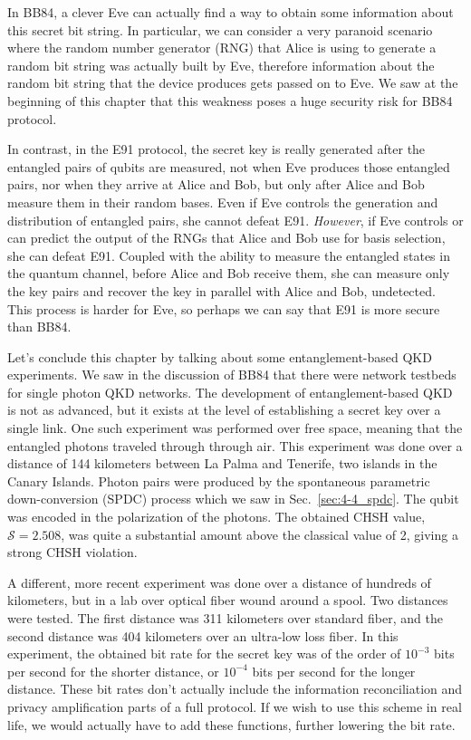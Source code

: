 In BB84, a clever Eve can actually find a way to obtain some information about this secret bit string. In particular, we can consider a very paranoid scenario where the random number generator (RNG) that Alice is using to generate a random bit string was actually built by Eve, therefore information about the random bit string that the device produces gets passed on to Eve. We saw at the beginning of this chapter that this weakness poses a huge security risk for BB84 protocol.

In contrast, in the E91 protocol, the secret key is really generated after the entangled pairs of qubits are measured, not when Eve produces those entangled pairs, nor when they arrive at Alice and Bob, but only after Alice and Bob measure them in their random bases. Even if Eve controls the generation and distribution of entangled pairs, she cannot defeat E91. \emph{However}, if Eve controls or can predict the output of the RNGs that Alice and Bob use for basis selection, she can defeat E91. Coupled with the ability to measure the entangled states in the quantum channel, before Alice and Bob receive them, she can measure only the key pairs and recover the key in parallel with Alice and Bob, undetected. This process is harder for Eve, so perhaps we can say that E91 is more secure than BB84.

Let's conclude this chapter by talking about some entanglement-based QKD experiments. We saw in the discussion of BB84 that there were network testbeds for single photon QKD networks. The development of entanglement-based QKD is not as advanced, but it exists at the level of establishing a secret key over a single link. One such experiment was performed over free space, meaning that the entangled photons traveled through through air.  This experiment was done over a distance of 144 kilometers between La Palma and Tenerife, two islands in the Canary Islands. Photon pairs were produced by the spontaneous parametric down-conversion (SPDC) process which we saw in Sec.~\ref{sec:4-4_spdc}. The qubit was encoded in the polarization of the photons. The obtained CHSH value, $\mathcal{S} =2.508$, was quite a substantial amount above the classical value of 2, giving a strong CHSH violation.

A different, more recent experiment was done over a distance of hundreds of kilometers, but in a lab over optical fiber wound around a spool.  Two distances were tested. The  first distance was 311 kilometers over standard fiber, and the second distance was 404 kilometers over an ultra-low loss fiber.  In this experiment, the obtained bit rate for the secret key was of the order of $10^{-3}$ bits per second for the shorter distance, or $10^{-4}$ bits per second for the longer distance. These bit rates don't actually include the information reconciliation and privacy amplification parts of a full protocol. If we wish to use this scheme in real life, we would actually have to add these functions, further lowering the bit rate.

